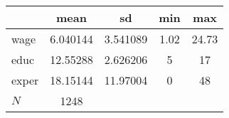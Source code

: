 {
\def\sym#1{\ifmmode^{#1}\else\(^{#1}\)\fi}
\begin{tabular}{l*{1}{cccc}}
\hline\hline
            &        mean&          sd&         min&         max\\
\hline
wage        &    6.040144&    3.541089&        1.02&       24.73\\
educ        &    12.55288&    2.626206&           5&          17\\
exper       &    18.15144&    11.97004&           0&          48\\
\hline
\(N\)       &        1248&            &            &            \\
\hline\hline
\end{tabular}
}
